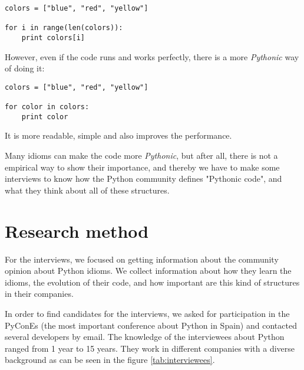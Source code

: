 \documentclass[a4paper]{article}
\begin{document}
\begin{verbatim}
colors = ["blue", "red", "yellow"]

for i in range(len(colors)):
    print colors[i]
\end{verbatim}

However, even if the code runs and works perfectly, there is a more \emph{Pythonic} way of
doing it:

\begin{verbatim}
colors = ["blue", "red", "yellow"]

for color in colors:
    print color
\end{verbatim}

It is more readable, simple and also improves the performance.

Many idioms can make the code more \textit{Pythonic}, but after all, there  is not  a  empirical  way  to  show  their importance, and thereby we have to make some interviews to know how the Python community defines "Pythonic code", and what they think about all of these structures.


\section{Research method}

For the interviews, we focused on getting information about the community opinion about Python idioms. We collect information about how they learn the idioms, the evolution of their code, and how important are this kind of structures in their companies.

In order to find candidates for the interviews, we asked for participation in the PyConEs (the most important conference about Python in Spain) and contacted several developers by email. The knowledge of the interviewees about Python ranged from 1 year to 15 years. They work in different companies with a diverse background as can be seen in the figure \ref{tab:interviewees}.
\end{document}
